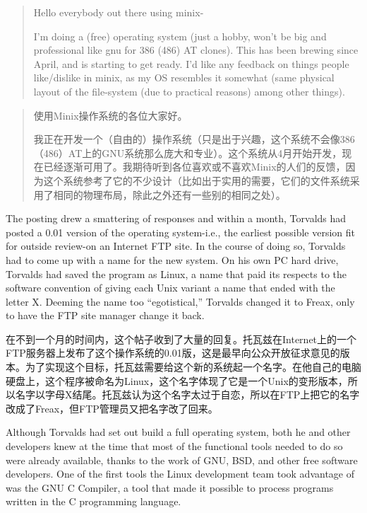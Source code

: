 \ifdefined\eng
\begin{quote}
Hello everybody out there using minix-

I'm doing a (free) operating system (just a hobby, won't be big and professional like gnu for 386 (486) AT clones). This has been brewing since April, and is starting to get ready. I'd like any feedback on things people like/dislike in minix, as my OS resembles it somewhat (same physical layout of the file-system (due to practical reasons) among other things). 
\end{quote}
\fi

\ifdefined\chs
\begin{quote}
使用Minix操作系统的各位大家好。

我正在开发一个（自由的）操作系统（只是出于兴趣，这个系统不会像386（486）AT上的GNU系统那么庞大和专业）。这个系统从4月开始开发，现在已经逐渐可用了。我期待听到各位喜欢或不喜欢Minix的人们的反馈，因为这个系统参考了它的不少设计（比如出于实用的需要，它们的文件系统采用了相同的物理布局，除此之外还有一些别的相同之处）。
\end{quote}
\fi

\ifdefined\eng
The posting drew a smattering of responses and within a month, Torvalds had posted a 0.01 version of the operating system-i.e., the earliest possible version fit for outside review-on an Internet FTP site. In the course of doing so, Torvalds had to come up with a name for the new system. On his own PC hard drive, Torvalds had saved the program as Linux, a name that paid its respects to the software convention of giving each Unix variant a name that ended with the letter X. Deeming the name too ``egotistical,'' Torvalds changed it to Freax, only to have the FTP site manager change it back.
\fi

\ifdefined\chs
在不到一个月的时间内，这个帖子收到了大量的回复。托瓦兹在Internet上的一个FTP服务器上发布了这个操作系统的0.01版，这是最早向公众开放征求意见的版本。为了实现这个目标，托瓦兹需要给这个新的系统起一个名字。在他自己的电脑硬盘上，这个程序被命名为Linux，这个名字体现了它是一个Unix的变形版本，所以名字以字母X结尾。托瓦兹认为这个名字太过于自恋，所以在FTP上把它的名字改成了Freax，但FTP管理员又把名字改了回来。
\fi

\ifdefined\eng
Although Torvalds had set out build a full operating system, both he and other developers knew at the time that most of the functional tools needed to do so were already available, thanks to the work of GNU, BSD, and other free software developers. One of the first tools the Linux development team took advantage of was the GNU C Compiler, a tool that made it possible to process programs written in the C programming language.
\fi

